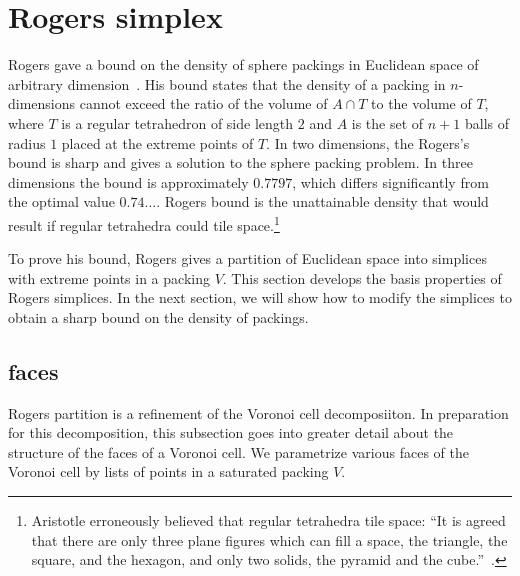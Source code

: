 \section{Rogers simplex}\label{sec:rogers}




Rogers gave a bound on the density of sphere packings in Euclidean
space of arbitrary dimension~\cite{Rogers:1958:Packing}.  His bound
states that the density of a packing in $n$-dimensions cannot exceed
the ratio of the volume of $A \cap T$ to the volume of $T$, where $T$
is a regular tetrahedron of side length $2$ and $A$ is the set of
$n+1$ balls of radius $1$ placed at the extreme points of $T$.  In two
dimensions, the Rogers's bound is sharp and gives a solution to the
sphere packing problem.  In three dimensions the bound is
approximately $0.7797$, which differs significantly from the optimal
value $0.74\ldots$.  Rogers bound is the unattainable density that
would result if regular tetrahedra could tile
space.\footnote{Aristotle erroneously believed that regular tetrahedra
  tile space: ``It is agreed that there are only three plane figures
  which can fill a space, the triangle, the square, and the hexagon,
  and only two solids, the pyramid and the cube.''~\cite{Aristotle}.}

To prove his bound, Rogers gives a partition of Euclidean space into
simplices with extreme points in a packing $V$.   This section develops
the basis properties of Rogers simplices.  In the next section, we
will show how to modify the simplices to obtain a sharp bound on the
density of packings.




\subsection{faces}

Rogers partition is a refinement of the Voronoi cell decomposiiton.
In preparation for this decomposition, this subsection goes into
greater detail about the structure of the faces of a Voronoi cell.  We
parametrize various faces of the Voronoi cell by lists of points in a
saturated packing $V$.


